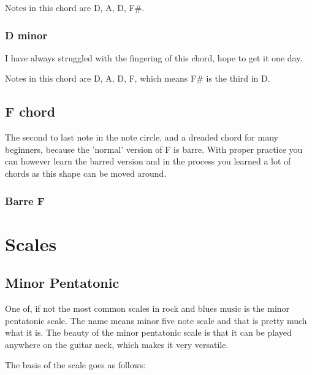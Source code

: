\documentclass[11pt]{book}
\begin{document}
    \chordscheme[
    name = D,
    finger = {2/3:1, 3/2:3, 2/1:2},
    ring = {4},
    mute = {6,5}
    ]

    Notes in this chord are D, A, D, F\#.

    \subsection{D minor}
    I have always struggled with the fingering of this chord, hope to get it one day.

    \chordscheme[
    name = Dm,
    finger = {2/3:2, 3/2:3, 1/1:1},
    ring = {4},
    mute = {5,6}
    ]

    Notes in this chord are D, A, D, F, which means F\# is the third in D.


    \section{F chord}
    The second to last note in the note circle, and a dreaded chord for many beginners, because the 'normal' version of
    F is barre.
    With proper practice you can however learn the barred version and in the process you learned a lot of chords as this shape can be moved around.

    \subsection{Barre F}

    \chordscheme[
    name = F,
    finger = {3/5:4,3/4:4,2/3:2},
    barre = {1/1-6:1}
    ]


    \chapter{Scales}


    \section{Minor Pentatonic}
    One of, if not the most common scales in rock and blues music is the minor pentatonic scale.
    The name means minor five note scale and that is pretty much what it is.
    The beauty of the minor pentatonic scale is that it can be played anywhere on the guitar neck, which makes it very versatile.

    The basis of the scale goes as follows:

    \bigskip

    \scales[
    name = Minor Pentatonic,
    finger = {
    2/1:1, 5/1:4,
    2/2:1, 5/2:4,
    2/3:1, 4/3:3,
    2/4:1, 4/4:3,
    2/5:1, 4/5:3,
    2/6:1, 5/6:4
    },
    root = {2/6, 4/4, 2/1}
    ]
\end{document}
